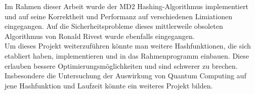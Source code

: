 Im Rahmen dieser Arbeit wurde der MD2 Hashing-Algorithmus implementiert und 
auf seine Korrektheit und Performanz auf verschiedenen Limiationen eingegangen.
Auf die Sicherheitsprobleme dieses mittlerweile obsoleten Algorithmus von Ronald Rivest wurde 
ebenfalls eingegangen.
\\
Um dieses Projekt weiterzuführen könnte man weitere Hashfunktionen, die sich etabliert haben,
implementieren und in das Rahmenprogramm einbauen.
Diese erlauben bessere
Optimierungsmöglichkeiten und sind schwerer zu brechen.
Insbesondere die Untersuchung der Auswirkung von Quantum Computing auf jene Hashfunktion
und Laufzeit könnte ein weiteres Projekt bilden.
